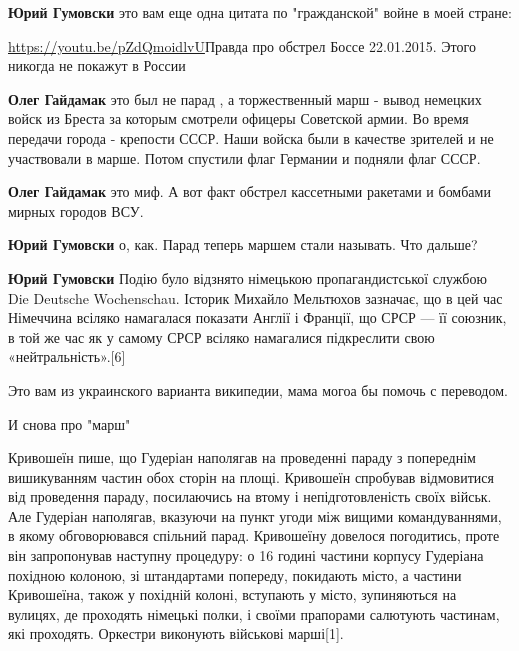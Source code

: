 \begin{itemize}
\textbf{Юрий Гумовски} это вам еще одна цитата по "гражданской" войне в моей стране:

\url{https://youtu.be/pZdQmoidlvU}{Правда про обстрел Боссе 22.01.2015. Этого никогда не покажут в России}


\textbf{Олег Гайдамак} это был не парад , а торжественный марш - вывод немецких войск из Бреста за которым смотрели офицеры Советской армии. Во время передачи города - крепости СССР. Наши войска были в качестве зрителей и не участвовали в марше. Потом спустили флаг Германии и подняли флаг СССР.


\textbf{Олег Гайдамак} это миф. А вот факт обстрел кассетными ракетами и бомбами мирных городов ВСУ.


\textbf{Юрий Гумовски} о, как. Парад теперь маршем стали называть. Что дальше?



\textbf{Юрий Гумовски} Подію було відзнято німецькою пропагандистської службою Die
Deutsche Wochenschau. Історик Михайло Мельтюхов зазначає, що в цей час
Німеччина всіляко намагалася показати Англії і Франції, що СРСР — її союзник, в
той же час як у самому СРСР всіляко намагалися підкреслити свою
«нейтральність».[6]

Это вам из украинского варианта википедии, мама могоа бы помочь с переводом.




И снова про "марш"

Кривошеїн пише, що Гудеріан наполягав на проведенні параду з попереднім
вишикуванням частин обох сторін на площі. Кривошеїн спробував відмовитися від
проведення параду, посилаючись на втому і непідготовленість своїх військ. Але
Гудеріан наполягав, вказуючи на пункт угоди між вищими командуваннями, в якому
обговорювався спільний парад. Кривошеїну довелося погодитись, проте він
запропонував наступну процедуру: о 16 годині частини корпусу Гудеріана похідною
колоною, зі штандартами попереду, покидають місто, а частини Кривошеїна, також
у похідній колоні, вступають у місто, зупиняються на вулицях, де проходять
німецькі полки, і своїми прапорами салютують частинам, які проходять. Оркестри
виконують військові марші[1].


\end{itemize}
